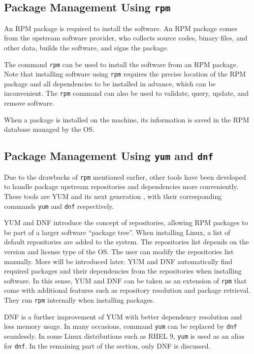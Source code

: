 \subsection{Package Management Using \texttt{rpm}}

An RPM package is required to install the software. An RPM package comes from the upstream software provider, who collects source codes, binary files, and other data, builds the software, and signs the package.

The command \verb|rpm| can be used to install the software from an RPM package. Note that installing software using \verb|rpm| requires the precise location of the RPM package and all dependencies to be installed in advance, which can be inconvenient. The \verb|rpm| command can also be used to validate, query, update, and remove software.

When a package is installed on the machine, its information is saved in the RPM database managed by the OS.

\subsection{Package Management Using \texttt{yum} and \texttt{dnf}}

Due to the drawbacks of \verb|rpm| mentioned earlier, other tools have been developed to handle package upstream repositories and dependencies more conveniently. These tools are YUM and its next generation , with their corresponding commands \verb|yum| and \verb|dnf| respectively. 

YUM and DNF introduce the concept of repositories, allowing RPM packages to be part of a larger software ``package tree''. When installing Linux, a list of default repositories are added to the system. The repositories list depends on the version and license type of the OS. The user can modify the repositories list manually. More will be introduced later. YUM and DNF automatically find required packages and their dependencies from the repositories when installing software. In this sense, YUM and DNF can be taken as an extension of \verb|rpm| that come with additional features such as repository resolution and package retrieval. They run \verb|rpm| internally when installing packages.

DNF is a further improvement of YUM with better dependency resolution and less memory usage. In many occasions, command \verb|yum| can be replaced by \verb|dnf| seamlessly. In some Linux distributions such as RHEL 9, \verb|yum| is used as an alias for \verb|dnf|. In the remaining part of the section, only DNF is discussed.

